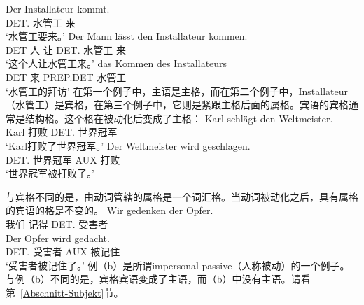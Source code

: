 \eal
\ex 
\gll Der Installateur kommt.\\
	 DET.\nom{} 水管工 来\\
\glt `水管工要来。'
\ex 
\gll Der Mann lässt den Installateur kommen.\\
	 DET 人 让 DET.\acc{} 水管工 来\\
\glt `这个人让水管工来。'
\ex 
\gll das Kommen des Installateurs\\
	 DET 来 PREP.DET 水管工\\
\glt `水管工的拜访'
\zl
在第一个例子中，主语是主格，而在第二个例子中，Installateur（水管工）是宾格，在第三个例子中，它则是紧跟主格后面的属格。宾语的宾格通常是结构格。这个格在被动化后变成了主格：
\eal
\ex 
\gll Karl schlägt den Weltmeister.\\
     Karl 打败 DET.\acc{} 世界冠军\\
\glt `Karl打败了世界冠军。'
\ex 
\gll Der Weltmeister wird geschlagen.\\
	 DET.\nom{} 世界冠军 AUX 打败\\
\glt `世界冠军被打败了。'
\zl

\noindent
与宾格不同的是，由动词管辖的属格是一个词汇格。当动词被动化之后，具有属格的宾语的格是不变的。
\eal
\ex
\gll Wir gedenken der Opfer.\\
     我们 记得 DET.\gen{} 受害者\\
\ex 
\gll Der Opfer wird gedacht.\\
	 DET.\gen{} 受害者 AUX 被记住\\
\glt `受害者被记住了。'
\zl
例（b）是所谓impersonal passive（人称被动）的一个例子。与例（b）不同的是，宾格宾语变成了主语，而（b）中没有主语。请看第~\ref{Abschnitt-Subjekt}节。


